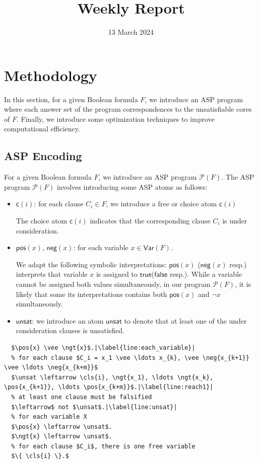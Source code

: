 \documentclass{article}
\title{Weekly Report}
\newcommand{\unsat}{\ensuremath{\mathsf{unsat}}}
\newcommand{\pos}[1]{\ensuremath{\mathsf{pos}(#1)}}
\newcommand{\ngt}[1]{\ensuremath{\mathsf{neg}(#1)}}
\newcommand{\cls}[1]{\ensuremath{\mathsf{c}(#1)}}
\newcommand{\program}[1]{\mathcal{P}(#1)}
\newcommand{\true}{\ensuremath{\mathsf{true}}\xspace}
\newcommand{\false}{\ensuremath{\mathsf{false}}\xspace}
\newcommand{\Var}[1]{\mathsf{Var}(#1)}
\begin{document}
\date{13 March 2024}
\section{Methodology}
In this section, for a given Boolean formula $F$, we introduce an ASP program where each answer set of the program correspondences to the unsatisfiable cores of $F$.
Finally, we introduce some optimization techniques to improve computational efficiency.  
\subsection{ASP Encoding}
For a given Boolean formula $F$, we introduce an ASP program $\program{F}$.
The ASP program $\program{F}$ involves introducing some ASP atoms as follows:
\begin{itemize}
  \item $\cls{i}$: for each clause $C_i \in F$, we introduce a free or choice atom $\cls{i}$
  
  The choice atom $\cls{i}$ indicates that the corresponding clause $C_i$ is under consideration. 
  \item $\pos{x}$, $\ngt{x}$: for each variable $x \in \Var{F}$. 
  
  We adapt the following symbolic interpretations: $\pos{x}$ ($\ngt{x}$ resp.) interprets that variable $x$ is assigned to \true (\false resp.). While 
  a variable cannot be assigned both values simultaneously, in our program $\program{F}$, it is likely that some its interpretations contains both $\pos{x}$ and $\neg{x}$ simultaneously. 
  \item $\unsat$: we introduce an atom $\unsat$ to denote that at least one of the under consideration clauses is unsatisfied.
\end{itemize}
\begin{lstlisting}[caption={Program $\program{F}$},label={code:as_to_uc},captionpos=b,mathescape=true,escapechar=|,float]
  % for each variable $x \in X$
  $\pos{x} \vee \ngt{x}$.|\label{line:each_variable}|
  % for each clause $C_i = x_1 \vee \ldots x_{k}, \vee \neg{x_{k+1}} \vee \ldots \neg{x_{k+m}}$
  $\unsat \leftarrow \cls{i}, \ngt{x_1}, \ldots \ngt{x_k}, \pos{x_{k+1}}, \ldots \pos{x_{k+m}}$.|\label{line:reach1}|
  % at least one clause must be falsified
  $\leftarrow$ not $\unsat$.|\label{line:unsat}|
  % for each variable X
  $\pos{x} \leftarrow \unsat$.
  $\ngt{x} \leftarrow \unsat$.
  % for each clause $C_i$, there is one free variable
  $\{ \cls{i} \}.$
\end{lstlisting}
\end{document}
